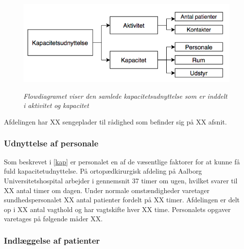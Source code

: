 \begin{figure}[H]
\flushleft 
	\centering
	\includegraphics[scale=.45]{figures/Kapacitetsudnyttelse.png}
	\label{kapacitet}
	\flushleft
	\caption{\textit{Flowdiagramet viser den samlede kapacitetsudnyttelse som er inddelt i aktivitet og kapacitet \cite{Company2013}}}
\end{figure}

Afdelingen har XX sengeplader til rådighed som befinder sig på XX afsnit. 

\subsubsection{Udnyttelse af personale} 
Som beskrevet i \ref{kap} er personalet en af de væsentlige faktorer for at kunne få fuld kapacitetudnyttelse. På ortopædkirurgisk afdeling på Aalborg Universitetshospital arbejder i gennemsnit 37 timer om ugen, hvilket svarer til XX antal timer om dagen. \cite{Danske2015} Under normale omstændigheder varetager sundhedspersonalet XX antal patienter fordelt på XX timer. Afdelingen er delt op i XX antal vagthold og har vagtskifte hver XX time. Personalets opgaver varetages på følgende måder XX. 

\subsubsection{Indlæggelse af patienter}

